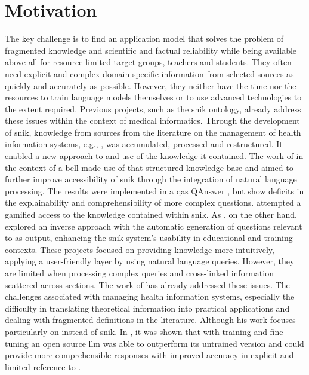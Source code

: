 \section{Motivation}\label{sec:motivation}

The key challenge is to find an application model that solves the problem of fragmented knowledge and scientific and factual reliability while being available above all for resource-limited target groups, teachers and students.
They often need explicit and complex domain-specific information from selected sources as quickly and accurately as possible. 
However, they neither have the time nor the resources to train language models themselves or to use advanced technologies to the extent required.
%
Previous projects, such as the \ac{snik} ontology, already address these issues within the context of medical informatics.
Through the development of \ac{snik}, knowledge from sources from the literature on the management of health information systems, e.g., \citet{bb2}, was accumulated, processed and restructured.    
It enabled a new approach to and use of the knowledge it contained. 
The work of \citet{hannesbell, hannesbell_skill} in the context of a \ac{bell} made use of that structured knowledge base and aimed to further improve accessibility of \ac{snik} through the integration of natural language processing.    
The results were implemented in a \ac{qas} QAnswer \citep{qanswer}, but show deficits in the explainability and comprehensibility of more complex questions. 
\citet{snikquiz} attempted a gamified access to the knowledge contained within \ac{snik}. 
As \citet{arneba}, on the other hand, explored an inverse approach with the automatic generation of questions relevant to \citep{snikquiz} as output, enhancing the \ac{snik} system's usability in educational and training contexts.
These projects focused on providing knowledge more intuitively, applying a user-friendly layer by using natural language queries.
%
However, they are limited when processing complex queries and cross-linked information scattered across sections.
The work of \citet{Paul_Keller} has already addressed these issues. 
The challenges associated with managing health information systems, especially the difficulty in translating theoretical information into practical applications and dealing with fragmented definitions in the literature.
Although his work focuses particularly on \citet{bb2} instead of \ac{snik}.
%
In \citet{Paul_Keller}, it was shown that with training and fine-tuning an open source \ac{llm} was able to outperform its untrained version and could provide more comprehensible responses with improved accuracy in explicit and limited reference to \citet{bb2}.
